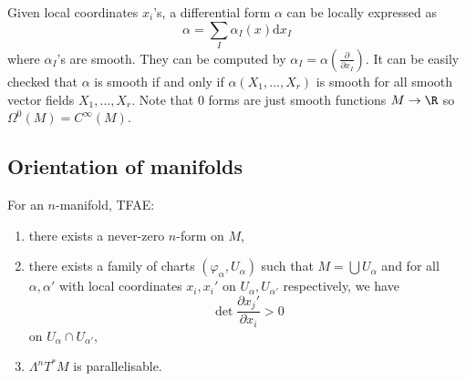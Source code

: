 \documentclass[a4paper]{article}
\begin{document}
Given local coordinates \(x_i\)'s, a differential form \(\alpha\) can be locally expressed as
\[
  \alpha = \sum_I \alpha_I(x) \mathrm dx_I
\]
where \(\alpha_I\)'s are smooth. They can be computed by \(\alpha_I = \alpha(\frac{\partial  }{\partial x_I})\). It can be easily checked that \(\alpha\) is smooth if and only if \(\alpha(X_1, \dots, X_r)\) is smooth for all smooth vector fields \(X_1, \dots, X_r\). Note that \(0\) forms are just smooth functions \(M \to \R\) so \(\Omega^0(M) = C^\infty(M)\).

\subsection{Orientation of manifolds}

\begin{theorem}
  For an \(n\)-manifold, TFAE:
  \begin{enumerate}
  \item there exists a never-zero \(n\)-form on \(M\),
  \item there exists a family of charts \((\varphi_\alpha, U_\alpha)\) such that \(M = \bigcup U_\alpha\) and for all \(\alpha, \alpha'\) with local coordinates \(x_i, x_i'\) on \(U_\alpha, U_{\alpha'}\) respectively, we have
    \[
      \det \frac{\partial x_j'}{\partial x_i} > 0
    \]
    on \(U_\alpha \cap U_{\alpha'}\),
  \item \(\Lambda^nT^*M\) is parallelisable.
  \end{enumerate}
\end{theorem}
\end{document}
